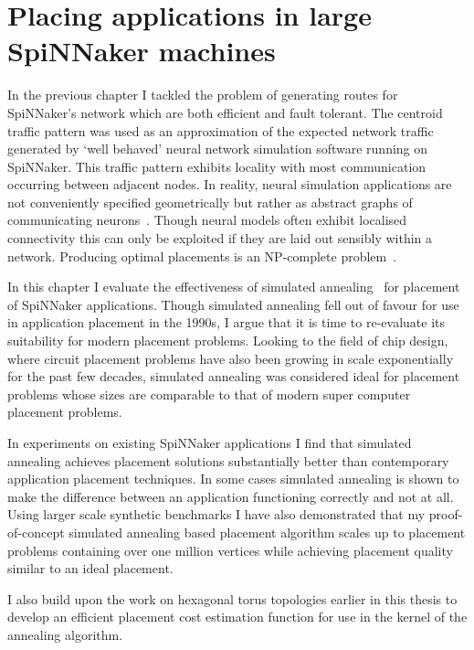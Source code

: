 \chapter{Placing applications in large SpiNNaker machines}
	
	\label{sec:placement}
	
	In the previous chapter I tackled the problem of generating routes for
	SpiNNaker's network which are both efficient and fault tolerant. The centroid
	traffic pattern was used as an approximation of the expected network traffic
	generated by `well behaved' neural network simulation software running on
	SpiNNaker. This traffic pattern exhibits locality with most communication
	occurring between adjacent nodes.  In reality, neural simulation applications
	are not conveniently specified geometrically but rather as abstract graphs of
	communicating neurons~\cite{davison08,eliasmith04}. Though neural models
	often exhibit localised connectivity this can only be exploited if they are
	laid out sensibly within a network. Producing optimal placements is an
	NP-complete problem~\cite{hoefler11}.
	
	In this chapter I evaluate the effectiveness of simulated
	annealing~\cite{kirkpatrick83} for placement of SpiNNaker applications.
	Though simulated annealing fell out of favour for use in application
	placement in the 1990s, I argue that it is time to re-evaluate its
	suitability for modern placement problems. Looking to the field of chip
	design, where circuit placement problems have also been growing in scale
	exponentially for the past few decades, simulated annealing was considered
	ideal for placement problems whose sizes are comparable to that of modern
	super computer placement problems.
	
	In experiments on existing SpiNNaker applications I find that simulated
	annealing achieves placement solutions substantially better than contemporary
	application placement techniques. In some cases simulated annealing is shown
	to make the difference between an application functioning correctly and not
	at all. Using larger scale synthetic benchmarks I have also demonstrated that
	my proof-of-concept simulated annealing based placement algorithm scales up
	to placement problems containing over one million vertices while achieving
	placement quality similar to an ideal placement.
	
	I also build upon the work on hexagonal torus topologies earlier in this
	thesis to develop an efficient placement cost estimation function for use in
	the kernel of the annealing algorithm.
	
